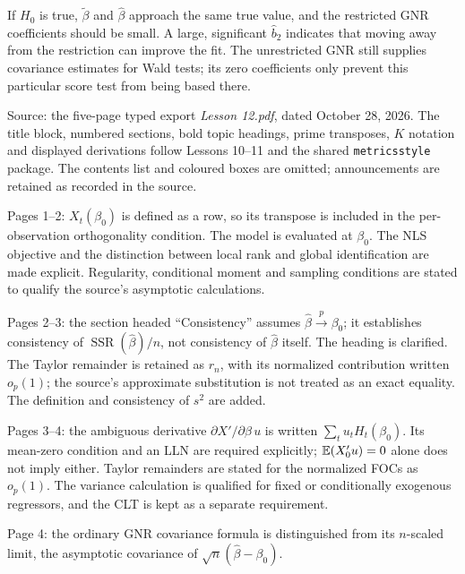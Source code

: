 \documentclass[11pt]{article}
\begin{document}
If $H_{0}$ is true, $\tilde\beta$ and $\hat\beta$ approach the same true value,
and the restricted GNR coefficients should be small. A large, significant
$\hat b_{2}$ indicates that moving away from the restriction can improve the fit.
The unrestricted GNR still supplies covariance estimates for Wald tests; its
zero coefficients only prevent this particular score test from being based there.

\clearpage
\begin{transcriptnotes}
 \item Source: the five-page typed export \emph{Lesson 12.pdf}, dated October 28,
       2026. The title block, numbered sections, bold topic headings, prime
       transposes, $K$ notation and displayed derivations follow Lessons 10--11
       and the shared \texttt{metricsstyle} package. The contents list and coloured
       boxes are omitted; announcements are retained as recorded in the source.
 \item Pages 1--2: $X_{t}(\beta_{0})$ is defined as a row, so its transpose is
       included in the per-observation orthogonality condition. The model is
       evaluated at $\beta_{0}$. The NLS objective and the distinction between
       local rank and global identification are made explicit. Regularity,
       conditional moment and sampling conditions are stated to qualify the
       source's asymptotic calculations.
 \item Pages 2--3: the section headed ``Consistency'' assumes
       $\hat\beta\xrightarrow{p}\beta_{0}$; it establishes consistency of
       $\operatorname{SSR}(\hat\beta)/n$, not consistency of $\hat\beta$ itself.
       The heading is clarified. The Taylor remainder is retained as $r_{n}$,
       with its normalized contribution written $o_{p}(1)$; the source's
       approximate substitution is not treated as an exact equality.
       The definition and consistency of $s^{2}$ are added.
 \item Pages 3--4: the ambiguous derivative $\partial X'/\partial\beta\,u$
       is written $\sum_{t}u_{t}H_{t}(\beta_{0})$. Its mean-zero condition and an
       LLN are required explicitly; $\mathbb{E}(X_{0}'u)=0$ alone does not imply either.
       Taylor remainders are stated for the normalized FOCs as $o_{p}(1)$.
       The variance calculation is qualified for fixed or conditionally
       exogenous regressors, and the CLT is kept as a separate requirement.
 \item Page 4: the ordinary GNR covariance formula is distinguished from its
       $n$-scaled limit, the asymptotic covariance of $\sqrt{n}(\hat\beta-\beta_{0})$.

\end{transcriptnotes}
\end{document}
